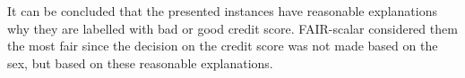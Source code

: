 \documentclass[preprint,12pt]{elsarticle}
\begin{document}
It can be concluded that the presented instances have reasonable explanations why they are labelled with bad or good credit score. FAIR-scalar considered them the most fair since the decision on the credit score was not made based on the sex, but based on these reasonable explanations.

\begin{table}
	\centering
	\caption{Instances form the German credit dataset which FAIR-scalar considers most fair}
\end{table}
\end{document}
